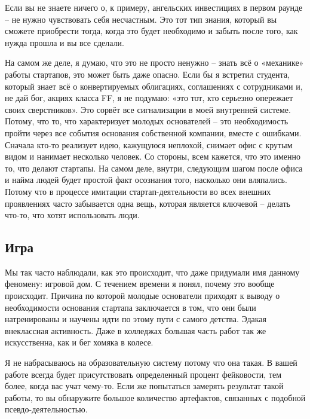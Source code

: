 \documentclass[ebook,12pt,oneside,openany]{memoir}
\begin{document}
Если вы не знаете ничего о, к примеру, ангельских инвестициях в первом
раунде – не нужно чувствовать себя несчастным. Это тот тип знания,
который вы сможете приобрести тогда, когда это будет необходимо и
забыть после того, как нужда прошла и вы все сделали. \newline

На самом же деле, я думаю, что это не просто ненужно – знать всё о
«механике» работы стартапов, это может быть даже опасно. Если бы я
встретил студента, который знает всё о конвертируемых облигациях,
соглашениях с сотрудниками и, не дай бог, акциях класса FF, я не
подумаю: «это тот, кто серьезно опережает своих сверстников». Это
сорвёт все сигнализации в моей внутренней системе. Потому, что то, что
характеризует молодых основателей – это необходимость пройти через все
события основания собственной компании, вместе с ошибками. Сначала
кто-то реализует идею, кажущуюся неплохой, снимает офис с крутым видом
и нанимает несколько человек. Со стороны, всем кажется, что это именно
то, что делают стартапы. На самом деле, внутри, следующим шагом после
офиса и найма людей будет простой факт осознания того, насколько они
вляпались. Потому что в процессе имитации стартап-деятельности во всех
внешних проявлениях часто забывается одна вещь, которая является
ключевой – делать что-то, что хотят использовать люди. \newline

\subsection{Игра}

Мы так часто наблюдали, как это происходит, что даже придумали имя
данному феномену: игровой дом. С течением времени я понял, почему это
вообще происходит. Причина по которой молодые основатели приходят к
выводу о необходимости основания стартапа заключается в том, что они
были натренированы и научены идти по этому пути с самого детства.
Эдакая внеклассная активность. Даже в колледжах большая часть работ
так же искусственна, как и бег хомяка в колесе. \newline

Я не набрасываюсь на образовательную систему потому что она такая. В
вашей работе всегда будет присутствовать определенный процент
фейковости, тем более, когда вас учат чему-то. Если же попытаться
замерять результат такой работы, то вы обнаружите большое количество
артефактов, связанных с подобной псевдо-деятельностью. \newline
\end{document}
